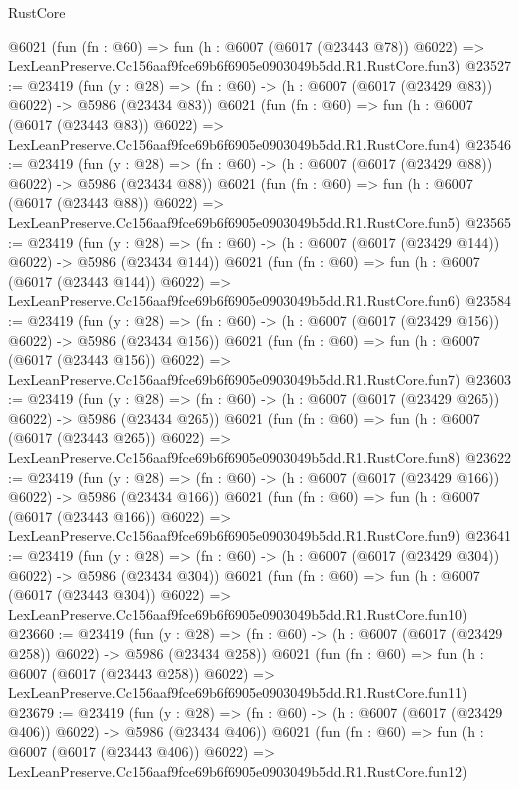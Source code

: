 \begin{lexlean}{RustCore}
\begin{coremodule}
    @6021
    (fun (fn : @60) =>
    fun (h : @6007 (@6017 (@23443 @78)) @6022) =>
    LexLeanPreserve.Cc156aaf9fce69b6f6905e0903049b5dd.R1.RustCore.fun3)
@23527 := @23419
    (fun (y : @28) => (fn : @60) -> (h : @6007 (@6017 (@23429 @83)) @6022) -> @5986 (@23434 @83))
    @6021
    (fun (fn : @60) =>
    fun (h : @6007 (@6017 (@23443 @83)) @6022) =>
    LexLeanPreserve.Cc156aaf9fce69b6f6905e0903049b5dd.R1.RustCore.fun4)
@23546 := @23419
    (fun (y : @28) => (fn : @60) -> (h : @6007 (@6017 (@23429 @88)) @6022) -> @5986 (@23434 @88))
    @6021
    (fun (fn : @60) =>
    fun (h : @6007 (@6017 (@23443 @88)) @6022) =>
    LexLeanPreserve.Cc156aaf9fce69b6f6905e0903049b5dd.R1.RustCore.fun5)
@23565 := @23419
    (fun (y : @28) => (fn : @60) -> (h : @6007 (@6017 (@23429 @144)) @6022) -> @5986 (@23434 @144))
    @6021
    (fun (fn : @60) =>
    fun (h : @6007 (@6017 (@23443 @144)) @6022) =>
    LexLeanPreserve.Cc156aaf9fce69b6f6905e0903049b5dd.R1.RustCore.fun6)
@23584 := @23419
    (fun (y : @28) => (fn : @60) -> (h : @6007 (@6017 (@23429 @156)) @6022) -> @5986 (@23434 @156))
    @6021
    (fun (fn : @60) =>
    fun (h : @6007 (@6017 (@23443 @156)) @6022) =>
    LexLeanPreserve.Cc156aaf9fce69b6f6905e0903049b5dd.R1.RustCore.fun7)
@23603 := @23419
    (fun (y : @28) => (fn : @60) -> (h : @6007 (@6017 (@23429 @265)) @6022) -> @5986 (@23434 @265))
    @6021
    (fun (fn : @60) =>
    fun (h : @6007 (@6017 (@23443 @265)) @6022) =>
    LexLeanPreserve.Cc156aaf9fce69b6f6905e0903049b5dd.R1.RustCore.fun8)
@23622 := @23419
    (fun (y : @28) => (fn : @60) -> (h : @6007 (@6017 (@23429 @166)) @6022) -> @5986 (@23434 @166))
    @6021
    (fun (fn : @60) =>
    fun (h : @6007 (@6017 (@23443 @166)) @6022) =>
    LexLeanPreserve.Cc156aaf9fce69b6f6905e0903049b5dd.R1.RustCore.fun9)
@23641 := @23419
    (fun (y : @28) => (fn : @60) -> (h : @6007 (@6017 (@23429 @304)) @6022) -> @5986 (@23434 @304))
    @6021
    (fun (fn : @60) =>
    fun (h : @6007 (@6017 (@23443 @304)) @6022) =>
    LexLeanPreserve.Cc156aaf9fce69b6f6905e0903049b5dd.R1.RustCore.fun10)
@23660 := @23419
    (fun (y : @28) => (fn : @60) -> (h : @6007 (@6017 (@23429 @258)) @6022) -> @5986 (@23434 @258))
    @6021
    (fun (fn : @60) =>
    fun (h : @6007 (@6017 (@23443 @258)) @6022) =>
    LexLeanPreserve.Cc156aaf9fce69b6f6905e0903049b5dd.R1.RustCore.fun11)
@23679 := @23419
    (fun (y : @28) => (fn : @60) -> (h : @6007 (@6017 (@23429 @406)) @6022) -> @5986 (@23434 @406))
    @6021
    (fun (fn : @60) =>
    fun (h : @6007 (@6017 (@23443 @406)) @6022) =>
    LexLeanPreserve.Cc156aaf9fce69b6f6905e0903049b5dd.R1.RustCore.fun12)

\end{coremodule}
\end{lexlean}
